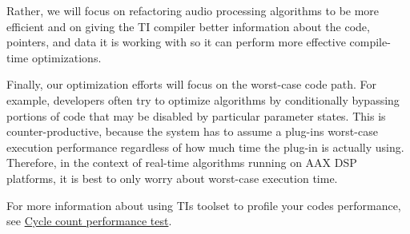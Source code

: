 Rather, we will focus on refactoring audio processing algorithms to be more efficient and on giving the T\+I compiler better information about the code, pointers, and data it is working with so it can perform more effective compile-\/time optimizations.

Finally, our optimization efforts will focus on the worst-\/case code path. For example, developers often try to optimize algorithms by conditionally bypassing portions of code that may be disabled by particular parameter states. This is counter-\/productive, because the system has to assume a plug-\/in\textquotesingle{}s worst-\/case execution performance regardless of how much time the plug-\/in is actually using. Therefore, in the context of real-\/time algorithms running on A\+A\+X D\+S\+P platforms, it is best to only worry about worst-\/case execution time.

For more information about using T\+I\textquotesingle{}s toolset to profile your code\textquotesingle{}s performance, see \hyperlink{a00365_subsection__cyclessharedtest}{Cycle count performance test}.

